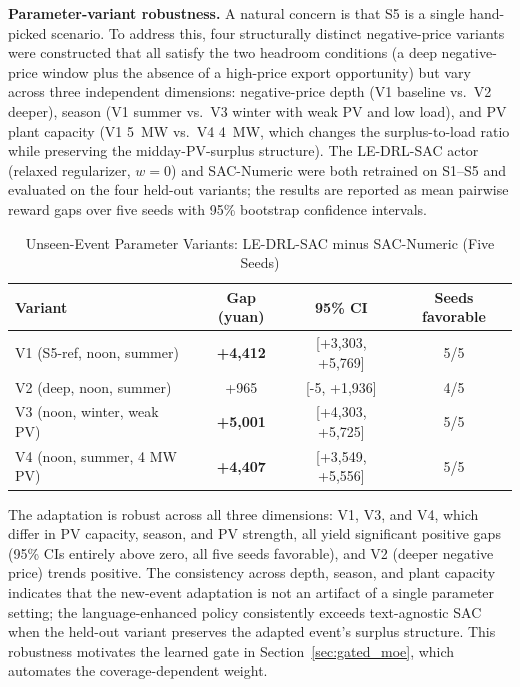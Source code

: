 \documentclass{ieeeaccess}
\begin{document}
\textbf{Parameter-variant robustness.} A natural concern is that S5 is a single hand-picked scenario. To address this, four structurally distinct negative-price variants were constructed that all satisfy the two headroom conditions (a deep negative-price window plus the absence of a high-price export opportunity) but vary across three independent dimensions: negative-price depth (V1 baseline vs.\ V2 deeper), season (V1 summer vs.\ V3 winter with weak PV and low load), and PV plant capacity (V1 5~MW vs.\ V4 4~MW, which changes the surplus-to-load ratio while preserving the midday-PV-surplus structure). The LE-DRL-SAC actor (relaxed regularizer, $w=0$) and SAC-Numeric were both retrained on S1--S5 and evaluated on the four held-out variants; the results are reported as mean pairwise reward gaps over five seeds with 95\% bootstrap confidence intervals.

\begin{table}[t!]
\caption{Unseen-Event Parameter Variants: LE-DRL-SAC minus SAC-Numeric (Five Seeds)}
\label{tab:s5_variants}
\centering
\begin{tabular}{lccc}
\toprule
\textbf{Variant} & \textbf{Gap (yuan)} & \textbf{95\% CI} & \textbf{Seeds favorable} \\
\midrule
V1 (S5-ref, noon, summer) & \textbf{+4,412} & [+3,303, +5,769] & 5/5 \\
V2 (deep, noon, summer) & +965 & [-5, +1,936] & 4/5 \\
V3 (noon, winter, weak PV) & \textbf{+5,001} & [+4,303, +5,725] & 5/5 \\
V4 (noon, summer, 4 MW PV) & \textbf{+4,407} & [+3,549, +5,556] & 5/5 \\
\bottomrule
\end{tabular}
\end{table}

The adaptation is robust across all three dimensions: V1, V3, and V4, which differ in PV capacity, season, and PV strength, all yield significant positive gaps (95\% CIs entirely above zero, all five seeds favorable), and V2 (deeper negative price) trends positive. The consistency across depth, season, and plant capacity indicates that the new-event adaptation is not an artifact of a single parameter setting; the language-enhanced policy consistently exceeds text-agnostic SAC when the held-out variant preserves the adapted event's surplus structure. This robustness motivates the learned gate in Section~\ref{sec:gated_moe}, which automates the coverage-dependent weight.
\end{document}
